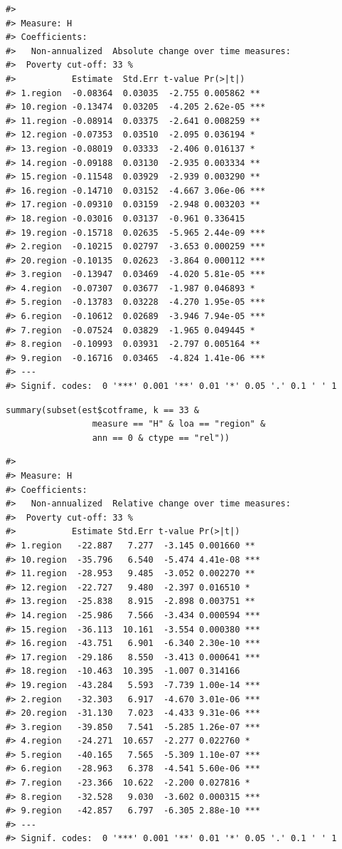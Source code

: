 \begin{verbatim}
#> 
#> Measure: H 
#> Coefficients:
#>   Non-annualized  Absolute change over time measures:
#>  Poverty cut-off: 33 % 
#>           Estimate  Std.Err t-value Pr(>|t|)    
#> 1.region  -0.08364  0.03035  -2.755 0.005862 ** 
#> 10.region -0.13474  0.03205  -4.205 2.62e-05 ***
#> 11.region -0.08914  0.03375  -2.641 0.008259 ** 
#> 12.region -0.07353  0.03510  -2.095 0.036194 *  
#> 13.region -0.08019  0.03333  -2.406 0.016137 *  
#> 14.region -0.09188  0.03130  -2.935 0.003334 ** 
#> 15.region -0.11548  0.03929  -2.939 0.003290 ** 
#> 16.region -0.14710  0.03152  -4.667 3.06e-06 ***
#> 17.region -0.09310  0.03159  -2.948 0.003203 ** 
#> 18.region -0.03016  0.03137  -0.961 0.336415    
#> 19.region -0.15718  0.02635  -5.965 2.44e-09 ***
#> 2.region  -0.10215  0.02797  -3.653 0.000259 ***
#> 20.region -0.10135  0.02623  -3.864 0.000112 ***
#> 3.region  -0.13947  0.03469  -4.020 5.81e-05 ***
#> 4.region  -0.07307  0.03677  -1.987 0.046893 *  
#> 5.region  -0.13783  0.03228  -4.270 1.95e-05 ***
#> 6.region  -0.10612  0.02689  -3.946 7.94e-05 ***
#> 7.region  -0.07524  0.03829  -1.965 0.049445 *  
#> 8.region  -0.10993  0.03931  -2.797 0.005164 ** 
#> 9.region  -0.16716  0.03465  -4.824 1.41e-06 ***
#> ---
#> Signif. codes:  0 '***' 0.001 '**' 0.01 '*' 0.05 '.' 0.1 ' ' 1
\end{verbatim}

\begin{verbatim}
summary(subset(est$cotframe, k == 33 & 
                 measure == "H" & loa == "region" &
                 ann == 0 & ctype == "rel"))
\end{verbatim}

\begin{verbatim}
#> 
#> Measure: H 
#> Coefficients:
#>   Non-annualized  Relative change over time measures:
#>  Poverty cut-off: 33 % 
#>           Estimate Std.Err t-value Pr(>|t|)    
#> 1.region   -22.887   7.277  -3.145 0.001660 ** 
#> 10.region  -35.796   6.540  -5.474 4.41e-08 ***
#> 11.region  -28.953   9.485  -3.052 0.002270 ** 
#> 12.region  -22.727   9.480  -2.397 0.016510 *  
#> 13.region  -25.838   8.915  -2.898 0.003751 ** 
#> 14.region  -25.986   7.566  -3.434 0.000594 ***
#> 15.region  -36.113  10.161  -3.554 0.000380 ***
#> 16.region  -43.751   6.901  -6.340 2.30e-10 ***
#> 17.region  -29.186   8.550  -3.413 0.000641 ***
#> 18.region  -10.463  10.395  -1.007 0.314166    
#> 19.region  -43.284   5.593  -7.739 1.00e-14 ***
#> 2.region   -32.303   6.917  -4.670 3.01e-06 ***
#> 20.region  -31.130   7.023  -4.433 9.31e-06 ***
#> 3.region   -39.850   7.541  -5.285 1.26e-07 ***
#> 4.region   -24.271  10.657  -2.277 0.022760 *  
#> 5.region   -40.165   7.565  -5.309 1.10e-07 ***
#> 6.region   -28.963   6.378  -4.541 5.60e-06 ***
#> 7.region   -23.366  10.622  -2.200 0.027816 *  
#> 8.region   -32.528   9.030  -3.602 0.000315 ***
#> 9.region   -42.857   6.797  -6.305 2.88e-10 ***
#> ---
#> Signif. codes:  0 '***' 0.001 '**' 0.01 '*' 0.05 '.' 0.1 ' ' 1
\end{verbatim}

